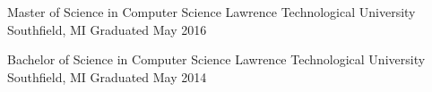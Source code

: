 \documentclass[11pt, a4paper]{awesome-cv}
\begin{document}
\begin{cventries}
    \cventry
    {Master of Science in Computer Science}
    {Lawrence Technological University}
    {Southfield, MI}
    {Graduated May 2016}
    {}

\vspace{-\baselineskip}

    \cventry
    {Bachelor of Science in Computer Science}
    {Lawrence Technological University}
    {Southfield, MI}
    {Graduated May 2014}
    {}
\end{cventries}

\vspace{-\baselineskip}
\end{document}

